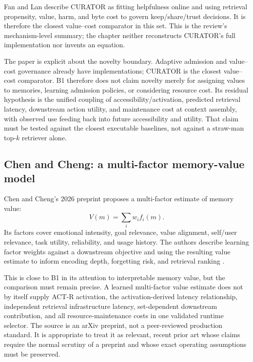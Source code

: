 Fan and Lan describe CURATOR as fitting helpfulness online and using retrieval propensity, value, harm, and byte cost to govern keep/share/trust decisions. It is therefore the closest value--cost comparator in this set. This is the review's mechanism-level summary; the chapter neither reconstructs CURATOR's full implementation nor invents an equation.

The paper is explicit about the novelty boundary. Adaptive admission and value--cost governance already have implementations; CURATOR is the closest value--cost comparator. B1 therefore does not claim novelty merely for assigning values to memories, learning admission policies, or considering resource cost. Its residual hypothesis is the unified coupling of accessibility/activation, predicted retrieval latency, downstream action utility, and maintenance cost at context assembly, with observed use feeding back into future accessibility and utility. That claim must be tested against the closest executable baselines, not against a straw-man top-$k$ retriever alone.

\subsection{Chen and Cheng: a multi-factor memory-value model}
\label{subsec:ch12-chen-cheng}

Chen and Cheng's 2026 preprint proposes a multi-factor estimate of memory value:
\begin{equation}
  V(m)=\sum_i w_i f_i(m).
  \label{eq:ch12-chen-cheng}
\end{equation}
Its factors cover emotional intensity, goal relevance, value alignment, self/user relevance, task utility, reliability, and usage history. The authors describe learning factor weights against a downstream objective and using the resulting value estimate to inform encoding depth, forgetting risk, and retrieval ranking \autocite{chencheng2026remember}.

This is close to B1 in its attention to interpretable memory value, but the comparison must remain precise. A learned multi-factor value estimate does not by itself supply ACT-R activation, the activation-derived latency relationship, independent retrieval infrastructure latency, set-dependent downstream contribution, and all resource-maintenance costs in one validated runtime selector. The source is an arXiv preprint, not a peer-reviewed production standard. It is appropriate to treat it as relevant, recent prior art whose claims require the normal scrutiny of a preprint and whose exact operating assumptions must be preserved.

